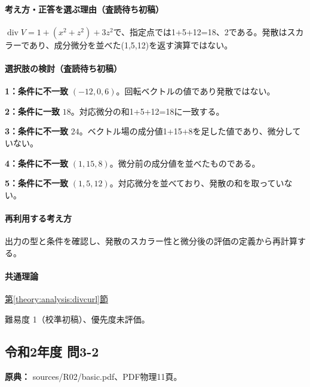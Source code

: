 \paragraph{考え方・正答を選ぶ理由（査読待ち初稿）} \(\operatorname{div}V=1+(x^2+z^2)+3z^2\)で、指定点では1+5+12=\allowbreak{}18、2である。発散はスカラーであり、成分微分を並べた(1,5,12)を返す演算ではない。

\paragraph{選択肢の検討（査読待ち初稿）}\mbox{}\par

\noindent\textbf{1：条件に不一致} \((-12,0,6)\)。回転ベクトルの値であり発散ではない。\par

\noindent\textbf{2：条件に一致} \(18\)。対応微分の和1+5+12=\allowbreak{}18に一致する。\par

\noindent\textbf{3：条件に不一致} \(24\)。ベクトル場の成分値1+15+8を足した値であり、微分していない。\par

\noindent\textbf{4：条件に不一致} \((1,15,8)\)。微分前の成分値を並べたものである。\par

\noindent\textbf{5：条件に不一致} \((1,5,12)\)。対応微分を並べており、発散の和を取っていない。\par

\paragraph{再利用する考え方} 出力の型と条件を確認し、発散のスカラー性と微分後の評価の定義から再計算する。

\paragraph{共通理論} \hyperref[theory:analysis:divcurl]{第\ref*{theory:analysis:divcurl}節}

\par 難易度 1（校準初稿）、優先度未評価。

\subsection{令和2年度 問3-2}
\label{q:r02-reg-basic-3-2}

\noindent\textbf{原典：} sources/R02/basic.pdf、PDF物理11頁。

